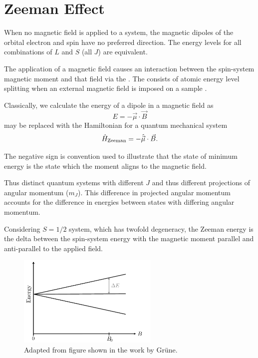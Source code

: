 \section{Zeeman Effect}\label{zeeman}
When no magnetic field is applied to a system, the magnetic dipoles of the orbital electron and spin have no preferred direction. 
The energy levels for all combinations of $L$ and $S$ (all $J$) are equivalent. 

The application of a magnetic field causes an interaction between the spin-system magnetic moment and 
that field via the . 
The  consists of atomic energy level splitting when an external magnetic field is imposed on a sample \cite{Nabokov2002}. 

Classically, we calculate the energy of a dipole in a magnetic field as
\begin{equation}
    E = -\vec{\mu}\cdot\vec{B}
    \label{eq:dipole_energy_scalar_prod}
\end{equation}
may be replaced with the Hamiltonian for a quantum mechanical system 
\begin{equation}
    \hat{H}_{\ce{Zeeman}} = - \hat{\vec{\mu}}\cdot \vec{B}. 
    \label{eq:}
\end{equation}

The negative sign is convention used to illustrate that the state of minimum energy is the state which the moment aligns to the magnetic field.

Thus distinct quantum systems with different $J$ and thus different projections of angular momentum ($m_J$). This difference in projected angular momentum accounts for the difference in energies between states with differing angular momentum.  

Considering $S=1/2$ system, which has twofold degeneracy, the Zeeman energy is the delta between the spin-system energy with the magnetic moment parallel and anti-parallel to the applied field. 


\begin{figure}[H]
    \begin{center}
        \includegraphics[width=0.6\textwidth]{figures/Zeeman.pdf}
    \end{center}
    \caption{Adapted from figure shown in the work by Gr\"{u}ne.}\label{fig:}
\end{figure}

